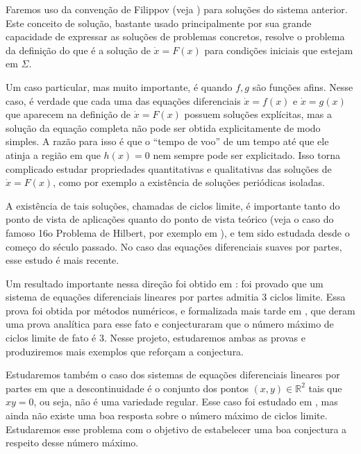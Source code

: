 \documentclass[12pt]{article}
\begin{document}
Faremos uso da convenção de Filippov (veja \cite{F}) para soluções do sistema anterior. Este conceito de solução, bastante usado principalmente por sua grande capacidade de expressar as soluções de problemas concretos, resolve o problema da definição do que é a solução de $\dot x=F(x)$ para condições iniciais que estejam em $\Sigma$.

Um caso particular, mas muito importante, é quando $f,g$ são funções afins. Nesse caso, é verdade que cada uma das equações diferenciais $\dot x=f(x)$ e $\dot x=g(x)$ que aparecem na definição de $\dot x=F(x)$ possuem soluções explícitas, mas a solução da equação completa não pode ser obtida explicitamente de modo simples. A razão para isso é que o ``tempo de voo'' de um tempo até que ele atinja a região em que $h(x)=0$ nem sempre pode ser explicitado. Isso torna complicado estudar propriedades quantitativas e qualitativas das soluções de $\dot x=F(x)$, como por exemplo a existência de soluções periódicas isoladas.

A existência de tais soluções, chamadas de ciclos limite, é importante tanto do ponto de vista de aplicações quanto do ponto de vista teórico (veja o caso do famoso 16o Problema de Hilbert, por exemplo em \cite{jaume2, coloquio,yu}), e tem sido estudada desde o começo do século passado. No caso das equações diferenciais suaves por partes, esse estudo é mais recente.

Um resultado importante nessa direção foi obtido em \cite{china1}: foi provado que um sistema de equações diferenciais lineares por partes admitia 3 ciclos limite. Essa prova foi obtida por métodos numéricos, e formalizada mais tarde em \cite{jaume1}, que deram uma prova analítica para esse fato e conjecturaram que o número máximo de ciclos limite de fato é 3. Nesse projeto, estudaremos ambas as provas e produziremos mais exemplos que reforçam a conjectura.

Estudaremos também o caso dos sistemas de equações diferenciais lineares por partes em que a descontinuidade é o conjunto dos pontos $(x,y)\in\mathbb R^2$ tais que $xy=0$, ou seja, não é uma variedade regular. Esse caso foi estudado em \cite{guilherme,paulo}, mas ainda não existe uma boa resposta sobre o número máximo de ciclos limite. Estudaremos esse problema com o objetivo de estabelecer uma boa conjectura a respeito desse número máximo.





%
%
%
%
\end{document}
